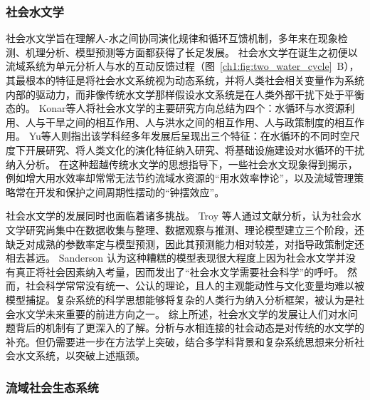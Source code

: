 \subsubsection{社会水文学}

社会水文学旨在理解人-水之间协同演化规律和循环互馈机制，多年来在现象检测、机理分析、模型预测等方面都获得了长足发展\cite{sivapalan2012, blair2016, srinivasan2016}。
社会水文学在诞生之初便以流域系统为单元分析人与水的互动反馈过程（图~\ref{ch1:fig:two_water_cycle}~B），其最根本的特征是将社会\textendash{}水文系统视为动态系统，并将人类社会相关变量作为系统内部的驱动力，而非像传统水文学那样假设水文系统是在人类外部干扰下处于平衡态的\cite{sivapalan2012}。
Konar等人将社会水文学的主要研究方向总结为四个：水循环与水资源利用、人与干旱之间的相互作用、人与洪水之间的相互作用、人与政策制度的相互作用\cite{konar2019}。
Yu等人则指出该学科经多年发展后呈现出三个特征：在水循环的不同时空尺度下开展研究、将人类文化的演化特征纳入研究、将基础设施建设对水循环的干扰纳入分析\cite{yu2020}。
在这种超越传统水文学的思想指导下，一些社会\textendash{}水文现象得到揭示，例如增大用水效率却常常无法节约流域水资源的“用水效率悖论”\cite{grafton2018, xiong2021}，以及流域管理策略常在开发和保护之间周期性摆动的“钟摆效应”\cite{kandasamy2014, roobavannan2017, mostert2018}。

社会水文学的发展同时也面临着诸多挑战。
Troy 等人通过文献分析，认为社会水文学研究尚集中在数据收集与整理、数据观察与推测、理论模型建立三个阶段，还缺乏对成熟的参数率定与模型预测，因此其预测能力相对较差，对指导政策制定还相去甚远\cite{troy2015}。
Sanderson 认为这种糟糕的模型表现很大程度上因为社会水文学并没有真正将社会因素纳入考量，因而发出了“社会水文学需要社会科学”的呼吁\cite{sanderson2017}。
然而，社会科学常常没有统一、公认的理论，且人的主观能动性与文化变量均难以被模型捕捉。复杂系统的科学思想能够将复杂的人类行为纳入分析框架，被认为是社会水文学未来重要的前进方向之一\cite{ahlstrom2021}。
综上所述，社会水文学的发展让人们对水问题背后的机制有了更深入的了解。分析与水相连接的社会动态是对传统的水文学的补充。但仍需要进一步在方法学上突破，结合多学科背景和复杂系统思想来分析社会\textendash{}水文系统，以突破上述瓶颈。


\subsubsection{流域社会\textendash{}生态系统}

